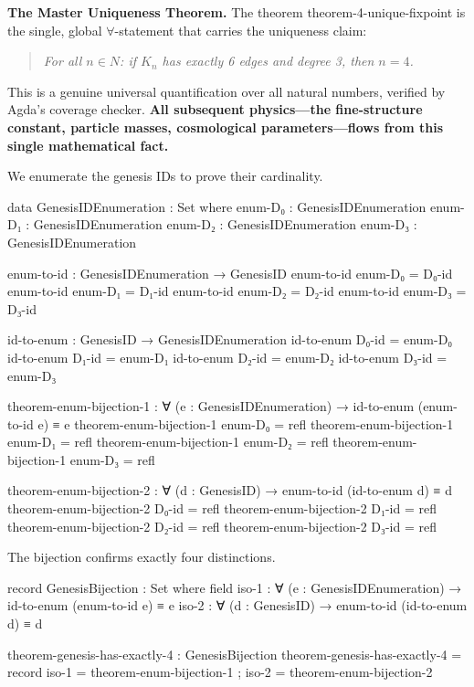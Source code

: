 \documentclass[11pt,a4paper]{book}
\def\mathbb#1{#1}%
\def\texttt#1{#1}%
\begin{document}
\textbf{The Master Uniqueness Theorem.} The theorem \texttt{theorem-4-unique-fixpoint} is the single, global $\forall$-statement that carries the uniqueness claim:

\begin{quote}
\emph{For all $n \in \mathbb{N}$: if $K_n$ has exactly 6 edges and degree 3, then $n = 4$.}
\end{quote}

This is a genuine universal quantification over all natural numbers, verified by Agda's coverage checker. \textbf{All subsequent physics---the fine-structure constant, particle masses, cosmological parameters---flows from this single mathematical fact.}

We enumerate the genesis IDs to prove their cardinality.

\begin{code}
data GenesisIDEnumeration : Set where
  enum-D₀ : GenesisIDEnumeration
  enum-D₁ : GenesisIDEnumeration
  enum-D₂ : GenesisIDEnumeration
  enum-D₃ : GenesisIDEnumeration

enum-to-id : GenesisIDEnumeration → GenesisID
enum-to-id enum-D₀ = D₀-id
enum-to-id enum-D₁ = D₁-id
enum-to-id enum-D₂ = D₂-id
enum-to-id enum-D₃ = D₃-id

id-to-enum : GenesisID → GenesisIDEnumeration
id-to-enum D₀-id = enum-D₀
id-to-enum D₁-id = enum-D₁
id-to-enum D₂-id = enum-D₂
id-to-enum D₃-id = enum-D₃

theorem-enum-bijection-1 : ∀ (e : GenesisIDEnumeration) → id-to-enum (enum-to-id e) ≡ e
theorem-enum-bijection-1 enum-D₀ = refl
theorem-enum-bijection-1 enum-D₁ = refl
theorem-enum-bijection-1 enum-D₂ = refl
theorem-enum-bijection-1 enum-D₃ = refl

theorem-enum-bijection-2 : ∀ (d : GenesisID) → enum-to-id (id-to-enum d) ≡ d
theorem-enum-bijection-2 D₀-id = refl
theorem-enum-bijection-2 D₁-id = refl
theorem-enum-bijection-2 D₂-id = refl
theorem-enum-bijection-2 D₃-id = refl

\end{code}

The bijection confirms exactly four distinctions.

\begin{code}
record GenesisBijection : Set where
  field
    iso-1 : ∀ (e : GenesisIDEnumeration) → id-to-enum (enum-to-id e) ≡ e
    iso-2 : ∀ (d : GenesisID) → enum-to-id (id-to-enum d) ≡ d

theorem-genesis-has-exactly-4 : GenesisBijection
theorem-genesis-has-exactly-4 = record
  { iso-1 = theorem-enum-bijection-1
  ; iso-2 = theorem-enum-bijection-2
  }

\end{code}
\end{document}
